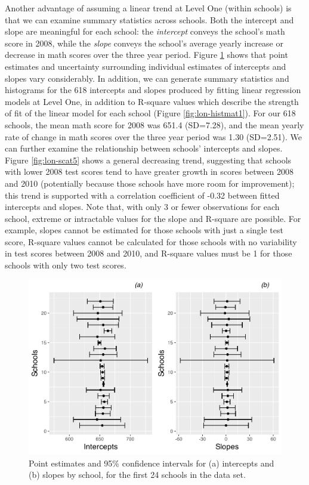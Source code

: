 \documentclass[
]{krantz}
\begin{document}
Another advantage of assuming a linear trend at Level One (within schools) is that we can examine summary statistics across schools. Both the intercept and slope are meaningful for each school: the \emph{intercept} conveys the school's math score in 2008, while the \emph{slope} conveys the school's average yearly increase or decrease in math scores over the three year period. Figure \ref{fig:lon-cis1} shows that point estimates and uncertainty surrounding individual estimates of intercepts and slopes vary considerably. In addition, we can generate summary statistics and histograms for the 618 intercepts and slopes produced by fitting linear regression models at Level One, in addition to R-square values which describe the strength of fit of the linear model for each school (Figure \ref{fig:lon-histmat1}). For our 618 schools, the mean math score for 2008 was 651.4 (SD=7.28), and the mean yearly rate of change in math scores over the three year period was 1.30 (SD=2.51). We can further examine the relationship between schools' intercepts and slopes. Figure \ref{fig:lon-scat5} shows a general decreasing trend, suggesting that schools with lower 2008 test scores tend to have greater growth in scores between 2008 and 2010 (potentially because those schools have more room for improvement); this trend is supported with a correlation coefficient of -0.32 between fitted intercepts and slopes. Note that, with only 3 or fewer observations for each school, extreme or intractable values for the slope and R-square are possible. For example, slopes cannot be estimated for those schools with just a single test score, R-square values cannot be calculated for those schools with no variability in test scores between 2008 and 2010, and R-square values must be 1 for those schools with only two test scores.



\begin{figure}

{\centering \includegraphics[width=0.6\linewidth]{bookdown-BeyondMLR_files/figure-latex/lon-cis1-1} 

}

\caption{Point estimates and 95\% confidence intervals for (a) intercepts and (b) slopes by school, for the first 24 schools in the data set.}\label{fig:lon-cis1}
\end{figure}
\end{document}
